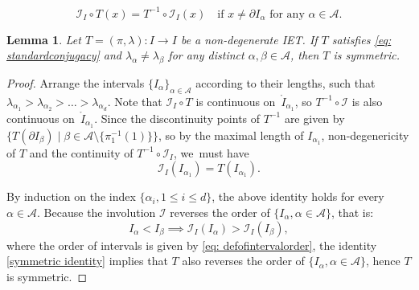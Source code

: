 \documentclass[10pt,a4paper]{article}
\theoremstyle{plain}
\newtheorem{lemma}[theorem]{Lemma}
\theoremstyle{definition}
\newcommand{\A}{\mathcal{A}}
\newcommand{\I}{\mathcal{I}}
\begin{document}
\begin{equation}\label{eq: standardconjugacy}
\mathcal{I}_I\circ T(x)=T^{-1}\circ\mathcal{I}_I(x) \quad \text{if } x \neq \partial I_{\alpha} \text{ for any } \alpha \in \A.
\end{equation}

\begin{lemma}
\label{lem: condition for symmetric iets,}
Let $T=(\pi,\lambda): I \to I$ be a non-degenerate IET. If $T$ satisfies
\eqref{eq: standardconjugacy}
and $\lambda_{\alpha}\neq \lambda_{\beta}$ for any distinct $\alpha, \beta \in \mathcal{A}$, then $T$ is symmetric.
\end{lemma}

\begin{proof}
Arrange the intervals $\{I_{\alpha}\}_{\alpha\in \A}$ according to their lengths, such that $\lambda_{\alpha_1}>\lambda_{\alpha_2}>\dots> \lambda_{\alpha_d}$.
Note that $\I_I\circ T$ is continuous on~$\mathring I_{\alpha_1}$, so $T^{-1}\circ \I$ is also continuous on~$\mathring I_{\alpha_1}$. Since the discontinuity points of $T^{-1}$ are given by $\{T(\partial I_{\beta}) \mid \beta\in \A {\setminus \{\pi_1^{-1}(1)\}}\}$, so by the maximal length of $I_{\alpha_1}$, non-degenericity of $T$ and the continuity of $T^{-1}\circ \I_I$, we~must have
\begin{equation}\label{symmetric identity}
\I_I(I_{\alpha_1})=T(I_{\alpha_1}).
\end{equation}

By induction on the index $\{\alpha_i, 1\le i\le d\}$, the above identity holds for every $\alpha \in \A$. Because the involution $\I$ reverses the order of $\{I_{\alpha}, \alpha \in \A\}$, that is:
\[
I_{\alpha}<I_{\beta}\implies \I_I(I_{\alpha})>\I_I(I_{\beta}),
\]
{where the order of intervals is given by \eqref{eq: defofintervalorder}, }the identity \eqref{symmetric identity} implies that $T$ also reverses the order of $\{I_{\alpha}, \alpha \in \A\}$, hence $T$ is symmetric.
\end{proof}
\end{document}
